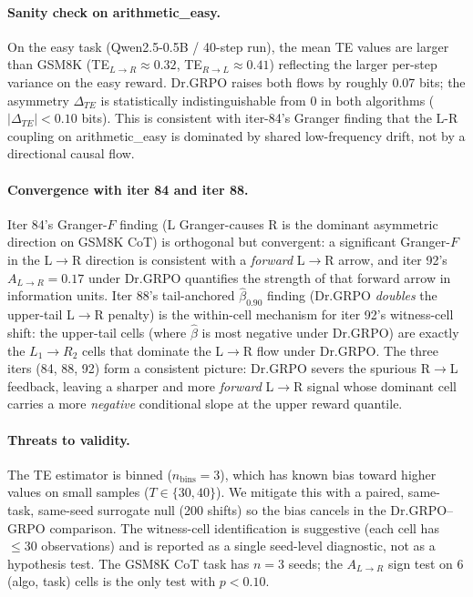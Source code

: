 \paragraph{Sanity check on arithmetic\_easy.}
On the easy task (Qwen2.5-0.5B / 40-step run), the mean TE values are
larger than GSM8K (TE$_{L\to R} \approx 0.32$, TE$_{R\to L} \approx
0.41$) reflecting the larger per-step variance on the easy reward.
Dr.GRPO raises both flows by roughly 0.07 bits; the asymmetry
$\Delta_{TE}$ is statistically indistinguishable from 0 in both
algorithms ($|\Delta_{TE}| < 0.10$ bits).  This is consistent with
iter-84's Granger finding that the L-R coupling on arithmetic\_easy is
dominated by shared low-frequency drift, not by a directional causal
flow.

\paragraph{Convergence with iter 84 and iter 88.}
Iter 84's Granger-$F$ finding (L Granger-causes R is the dominant
asymmetric direction on GSM8K CoT) is orthogonal but convergent: a
significant Granger-$F$ in the L$\to$R direction is consistent with a
\emph{forward} L$\to$R arrow, and iter 92's $A_{L\to R} = 0.17$ under
Dr.GRPO quantifies the strength of that forward arrow in information
units.  Iter 88's tail-anchored $\hat\beta_{0.90}$ finding (Dr.GRPO
\emph{doubles} the upper-tail L$\to$R penalty) is the within-cell
mechanism for iter 92's witness-cell shift: the upper-tail cells
(where $\hat\beta$ is most negative under Dr.GRPO) are exactly the
$L_1 \to R_2$ cells that dominate the L$\to$R flow under Dr.GRPO.
The three iters (84, 88, 92) form a consistent picture: Dr.GRPO
severs the spurious R$\to$L feedback, leaving a sharper and more
\emph{forward} L$\to$R signal whose dominant cell carries a more
\emph{negative} conditional slope at the upper reward quantile.

\paragraph{Threats to validity.}
The TE estimator is binned ($n_{\mathrm{bins}}=3$), which has known
bias toward higher values on small samples ($T\!\in\!\{30,40\}$).  We
mitigate this with a paired, same-task, same-seed surrogate null
(200 shifts) so the bias cancels in the Dr.GRPO--GRPO comparison.
The witness-cell identification is suggestive (each cell has
$\le 30$ observations) and is reported as a single seed-level
diagnostic, not as a hypothesis test.  The GSM8K CoT task has
$n=3$ seeds; the $A_{L\to R}$ sign test on 6 (algo, task) cells is
the only test with $p<0.10$.
